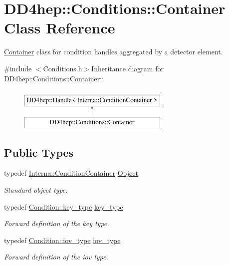 \hypertarget{class_d_d4hep_1_1_conditions_1_1_container}{
\section{DD4hep::Conditions::Container Class Reference}
\label{class_d_d4hep_1_1_conditions_1_1_container}
}


\hyperlink{class_d_d4hep_1_1_conditions_1_1_container}{Container} class for condition handles aggregated by a detector element.  


{\ttfamily \#include $<$Conditions.h$>$}Inheritance diagram for DD4hep::Conditions::Container::\begin{figure}[H]
\begin{center}
\leavevmode
\includegraphics[height=2cm]{class_d_d4hep_1_1_conditions_1_1_container}
\end{center}
\end{figure}
\subsection*{Public Types}
\begin{DoxyCompactItemize}
\item 
typedef \hyperlink{class_d_d4hep_1_1_conditions_1_1_interna_1_1_condition_container}{Interna::ConditionContainer} \hyperlink{class_d_d4hep_1_1_conditions_1_1_container_a45d612d4b81c549a40ca21e3318d3ddb}{Object}
\begin{DoxyCompactList}\small\item\em Standard object type. \item\end{DoxyCompactList}\item 
typedef \hyperlink{class_d_d4hep_1_1_conditions_1_1_condition_a7528efa762e8cc072ef80ea67c3531f9}{Condition::key\_\-type} \hyperlink{class_d_d4hep_1_1_conditions_1_1_container_a65e62d9e4a43b9b0e9e46a7b80876a21}{key\_\-type}
\begin{DoxyCompactList}\small\item\em Forward definition of the key type. \item\end{DoxyCompactList}\item 
typedef \hyperlink{class_d_d4hep_1_1_i_o_v}{Condition::iov\_\-type} \hyperlink{class_d_d4hep_1_1_conditions_1_1_container_a169b09fd183c9e05faf63429bad6c668}{iov\_\-type}
\begin{DoxyCompactList}\small\item\em Forward definition of the iov type. \item\end{DoxyCompactList}\end{DoxyCompactItemize}
